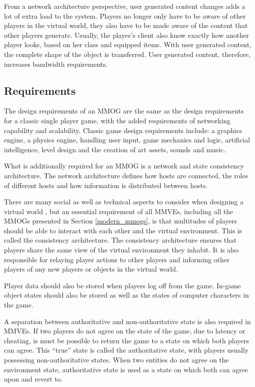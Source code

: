 From a network architecture perspective, user generated content changes adds a lot of extra load to the system. Players no longer only have to be aware of other players in the virtual world, they also have to be made aware of the content that other players generate. Usually, the player's client also know exactly how another player looks, based on her class and equipped items. With user generated content, the complete shape of the object is transferred. User generated content, therefore, increases bandwidth requirements.

\subsection{Requirements}
\label{mmve_requirements}

The design requirements of an MMOG are the same as the design requirements for a classic single player game, with the added requirements of networking capability and scalability. Classic game design requirements include: a graphics engine, a physics engine, handling user input, game mechanics and logic, artificial intelligence, level design and the creation of art assets, sounds and music.

What is additionally required for an MMOG is a network and state consistency architecture. The network architecture defines how hosts are connected, the roles of different hosts and how information is distributed between hosts.

There are many social as well as technical aspects to consider when designing a virtual world \cite{designing_virtual_worlds}, but an essential requirement of all MMVEs, including all the MMOGs presented in Section \ref{modern_mmogs}, is that multitudes of players should be able to interact with each other and the virtual environment. This is called the consistency architecture. The consistency architecture ensures that players share the same view of the virtual environment they inhabit. It is also responsible for relaying player actions to other players and informing other players of any new players or objects in the virtual world.

Player data should also be stored when players log off from the game. In-game object states should also be stored as well as the states of computer characters in the game.

A separation between authoritative and non-authoritative state is also required in MMVEs. If two players do not agree on the state of the game, due to latency or cheating, is must be possible to return the game to a state on which both players can agree. This ``true'' state is called the authoritative state, with players usually possessing non-authoritative states. When two entities do not agree on the environment state, authoritative state is used as a state on which both can agree upon and revert to.

